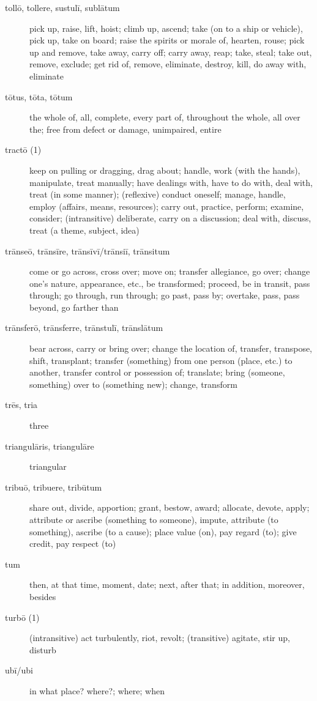 \begin{description}
    \item[tollō, tollere, sustulī, sublātum] pick up, raise, lift, hoist; climb up, ascend; take (on to a ship or vehicle), pick up, take on board; raise the spirits or morale of, hearten, rouse; pick up and remove, take away, carry off; carry away, reap; take, steal; take out, remove, exclude; get rid of, remove, eliminate, destroy, kill, do away with, eliminate
    \item[tōtus, tōta, tōtum] the whole of, all, complete, every part of, throughout the whole, all over the; free from defect or damage, unimpaired, entire
    \item[tractō (1)] keep on pulling or dragging, drag about; handle, work (with the hands), manipulate, treat manually; have dealings with, have to do with, deal with, treat (in some manner); (reflexive) conduct oneself; manage, handle, employ (affairs, means, resources); carry out, practice, perform; examine, consider; (intransitive) deliberate, carry on a discussion; deal with, discuss, treat (a theme, subject, idea)
    \item[trānseō, trānsīre, trānsīvī/trānsiī, trānsitum] come or go across, cross over; move on; transfer allegiance, go over; change one's nature, appearance, etc., be transformed; proceed, be in transit, pass through; go through, run through; go past, pass by; overtake, pass, pass beyond, go farther than
    \item[trānsferō, trānsferre, trānstulī, trānslātum] bear across, carry or bring over; change the location of, transfer, transpose, shift, transplant; transfer (something) from one person (place, etc.) to another, transfer control or possession of; translate; bring (someone, something) over to (something new); change, transform
    \item[trēs, tria] three
    \item[triangulāris, triangulāre] triangular
    \item[tribuō, tribuere, tribūtum] share out, divide, apportion; grant, bestow, award; allocate, devote, apply; attribute or ascribe (something to someone), impute, attribute (to something), ascribe (to a cause); place value (on), pay regard (to); give credit, pay respect (to)
    \item[tum] then, at that time, moment, date; next, after that; in addition, moreover, besides
    \item[turbō (1)] (intransitive) act turbulently, riot, revolt; (transitive) agitate, stir up, disturb
    \item[ubī/ubi] in what place? where?; where; when

\end{description}
